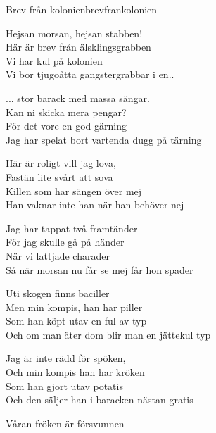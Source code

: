 \begin{song}{Brev från kolonien}{brevfrankolonien}
\begin{vers}
Hejsan morsan, hejsan stabben! \\
Här är brev från älsklingsgrabben\\
Vi har kul på kolonien\\
Vi bor tjugoåtta gangstergrabbar i en..\\
\end{vers}
\begin{vers}
... stor barack med massa sängar. \\
Kan ni skicka mera pengar?\\
För det vore en god gärning\\
Jag har spelat bort vartenda dugg på tärning\\
\end{vers}
\begin{vers}
Här är roligt vill jag lova, \\
Fastän lite svårt att sova\\
Killen som har sängen över mej\\
Han vaknar inte han när han behöver nej\\
\end{vers}
\begin{vers}
Jag har tappat två framtänder \\
För jag skulle gå på händer\\
När vi lattjade charader\\
Så när morsan nu får se mej får hon spader\\
\end{vers}
\begin{vers}
Uti skogen finns baciller \\
Men min kompis, han har piller\\
Som han köpt utav en ful av typ\\
Och om man äter dom blir man en jättekul typ\\
\end{vers}
\begin{vers}
Jag är inte rädd för spöken, \\
Och min kompis han har kröken\\
Som han gjort utav potatis\\
Och den säljer han i baracken nästan gratis\\
\end{vers}
\begin{vers}
Våran fröken är försvunnen \\

\end{vers}
\end{song}

